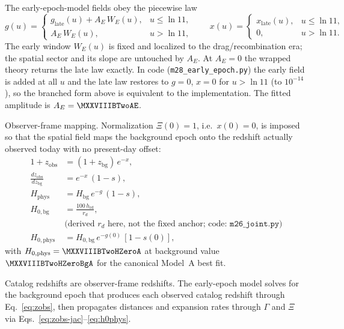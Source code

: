 The early-epoch-model fields obey the piecewise law
\begin{equation}
  g(u) =
  \begin{cases}
    g_{\mathrm{late}}(u) + A_{E}\,W_{E}(u), & u \le \ln 11, \\
    A_{E}\,W_{E}(u), & u > \ln 11,
  \end{cases}
  \qquad
  x(u) =
  \begin{cases}
    x_{\mathrm{late}}(u), & u \le \ln 11, \\
    0, & u > \ln 11.
  \end{cases}
  \label{eq:m28-piecewise}
\end{equation}
The early window $W_{E}(u)$ is fixed and localized to the
drag/recombination era; the spatial sector and its slope are untouched
by $A_{E}$. At $A_{E}=0$ the wrapped theory returns the late law
exactly. In code (\texttt{m28\_early\_epoch.py}) the early field is
added at all $u$ and the late law restores to $g=0$, $x=0$ for
$u>\ln11$ (to $10^{-14}$), so the branched form above is equivalent to
the implementation. The fitted amplitude is $A_{E}=\MXXVIIIBTwoAE$.

Observer-frame mapping. Normalization $\Xi(0)=1$, i.e.\ $x(0)=0$, is
imposed so that the spatial field maps the background epoch onto the
redshift actually observed today with no present-day offset:
\begin{align}
  1+z_{\mathrm{obs}} &= (1+z_{\mathrm{bg}})\,e^{-x},
  \label{eq:zobs} \\
  \frac{dz_{\mathrm{obs}}}{dz_{\mathrm{bg}}}
    &= e^{-x}\,(1-s),
  \label{eq:zobs-jac} \\
  H_{\mathrm{phys}} &= H_{\mathrm{bg}}\,e^{-g}\,(1-s),
  \label{eq:hphys} \\
  H_{0,\mathrm{bg}} &= \frac{100\,h_{\mathrm{rd}}}{r_{d}},
  \label{eq:h0bg} \\
  &\text{(derived $r_{d}$ here, not the fixed anchor; code: }
    \texttt{m26\_joint.py}\text{)}\nonumber \\
  H_{0,\mathrm{phys}}
    &= H_{0,\mathrm{bg}}\,e^{-g(0)}\,[1-s(0)],
  \label{eq:h0phys}
\end{align}
with $H_{0,\mathrm{phys}}=\MXXVIIIBTwoHZeroA$\kmsMpc{} at background
value $\MXXVIIIBTwoHZeroBgA$\kmsMpc{} for the canonical Model~A best fit.

Catalog redshifts are observer-frame redshifts. The early-epoch model solves for the
background epoch that produces each observed catalog redshift through
Eq.~\eqref{eq:zobs}, then propagates distances and expansion rates
through $\Gamma$ and $\Xi$ via
Eqs.~\eqref{eq:zobs-jac}--\eqref{eq:h0phys}.

